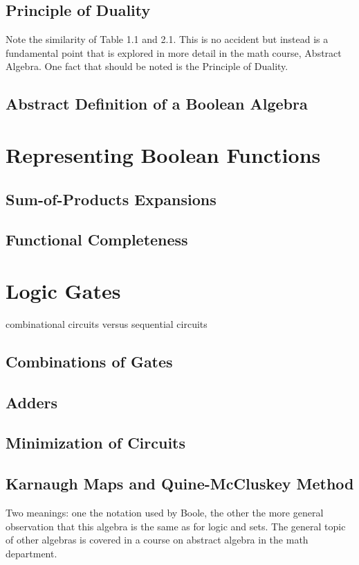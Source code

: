 \documentclass[11pt]{book} %
\theoremstyle {definition}
\theoremstyle {remark}
\begin{document}
    \subsection {Principle of Duality}
Note the similarity of Table 1.1 and 2.1. This is no accident but instead is a fundamental point that is explored in more detail in the math course, Abstract Algebra. One fact that should be noted is the Principle of Duality.

    \subsection {Abstract Definition of a Boolean Algebra}

\section {Representing Boolean Functions}
    \subsection {Sum-of-Products Expansions}
    \subsection {Functional Completeness}
    
\section {Logic Gates}
combinational circuits versus sequential circuits
    \subsection {Combinations of Gates}
    \subsection {Adders}
    \subsection {Minimization of Circuits}
    \subsection {Karnaugh Maps and Quine-McCluskey Method}

Two meanings: one the notation used by Boole, the other the more general observation that this algebra is the same as for logic and sets. The general topic of other algebras is covered in a course on abstract algebra in the math department. 
\end{document}
